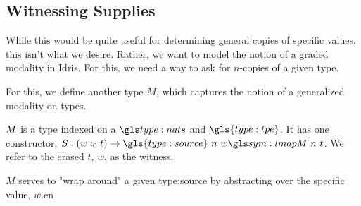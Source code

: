 \subsection{Witnessing Supplies}

While this would be quite useful for determining general copies of specific values, this isn't what we desire.
Rather, we want to model the notion of a graded modality in Idris.
For this, we need a way to ask for $n$-copies of a given type.

For this, we define another type $M$, which captures the notion of a generalized modality on types.

\begin{definition}
	$M$ is a type indexed on a $\nat$ and $\gls{type:tpe}$. 
	It has one constructor, $S : (w :_0 t) \to \gls{type:source} \ n \ w \proc \tmu \ n \ t$.
	We refer to the erased $t$, $w$, as the witness.
\end{definition}

$M$ serves to "wrap around" a given \gls{type:source} by abstracting over the specific value, $w$.en
